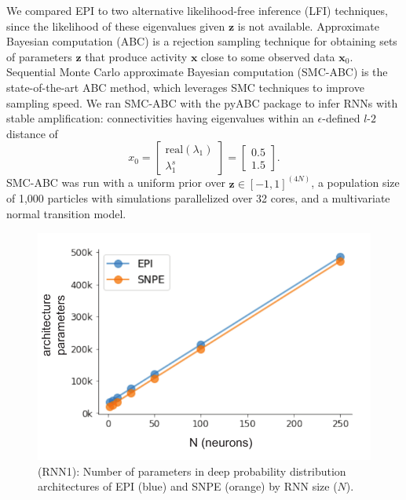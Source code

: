 \documentclass[11pt]{article}
\begin{document}
We compared EPI to two alternative likelihood-free inference (LFI) techniques, since the likelihood of these eigenvalues given $\mathbf{z}$ is not available.
Approximate Bayesian computation (ABC) \cite{beaumont2002approximate} is a rejection sampling technique for obtaining sets of parameters $\mathbf{z}$ that produce activity $\mathbf{x}$ close to some observed data $\mathbf{x}_0$.
Sequential Monte Carlo approximate Bayesian computation (SMC-ABC) is the state-of-the-art ABC method, which leverages SMC techniques to improve sampling speed.
We ran SMC-ABC with the pyABC package \cite{klinger2018pyabc} to infer RNNs with stable amplification: connectivities having eigenvalues within an $\epsilon$-defined $l$-$2$ distance of
\begin{equation}\label{eq:stab_amp_x0}
x_0 = \begin{bmatrix} \text{real}(\lambda_1) \\ \lambda^s_1 \end{bmatrix} = \begin{bmatrix} 0.5 \\ 1.5 \end{bmatrix}.
\end{equation}
SMC-ABC was run with a uniform prior over $\mathbf{z} \in \left[-1, 1 \right]^{(4N)}$, a population size of 1,000 particles with simulations parallelized over 32 cores, and a multivariate normal transition model.

\begin{figure}
\begin{center}
\includegraphics[scale=0.7]{figures/figRNN2/figRNN2.pdf}
\end{center}
\caption{\small (RNN1): 
Number of parameters in deep probability distribution architectures of EPI (blue) and SNPE (orange) by RNN size ($N$).
}
\label{fig:RNN1}
\end{figure}
\end{document}
